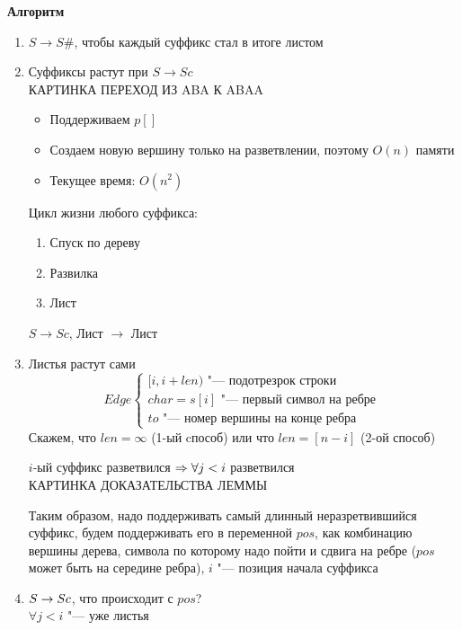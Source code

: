\textbf{Алгоритм}
\begin{enumerate}
\item
	$ S \to S\# $, чтобы каждый суффикс стал в итоге листом
\item
	Суффиксы растут при $ S \to Sc $ \\ 
	КАРТИНКА ПЕРЕХОД ИЗ ABA К ABAA \\
	\begin{itemize}
	\item
		Поддерживаем $ p[] $
	\item
		Создаем новую вершину только на разветвлении, поэтому $ O(n) $ памяти
	\item
		Текущее время: $ O(n^2) $
	\end{itemize}
	Цикл жизни любого суффикса:
	\begin{enumerate}
	\item
		Спуск по дереву
	\item
		Развилка
	\item
		Лист
	\end{enumerate}
	\begin{lemma}
		$ S \to Sc $, Лист $ \to $ Лист
	\end{lemma}
\item
	Листья растут сами
	\begin{equation*}
		Edge
		\begin{cases}
			[i, i + len) \text{ "--- подотрезрок строки } \\
			char = s[i] \text{ "--- первый символ на ребре } \\
			to \text{ "--- номер вершины на конце ребра } 
		\end{cases}
	\end{equation*}
	Скажем, что $len = \infty$ (1-ый cпособ) или что $len = [n - i]$ (2-ой способ)
	\begin{lemma}
		$i$-ый суффикс разветвился $\Rightarrow \forall j < i$ разветвился \\
		КАРТИНКА ДОКАЗАТЕЛЬСТВА ЛЕММЫ \\
	\end{lemma}
	Таким образом, надо поддерживать самый длинный неразретвившийся суффикс, будем поддерживать его в переменной $pos$, как комбинацию вершины дерева, символа по которому надо пойти и сдвига на ребре ($pos$ может быть на середине ребра), $i$ "--- позиция начала суффикса
\item
	$ S \rightarrow Sc $, что происходит с $pos$? \\
	$\forall j < i$ "--- уже листья \\

\end{enumerate}
